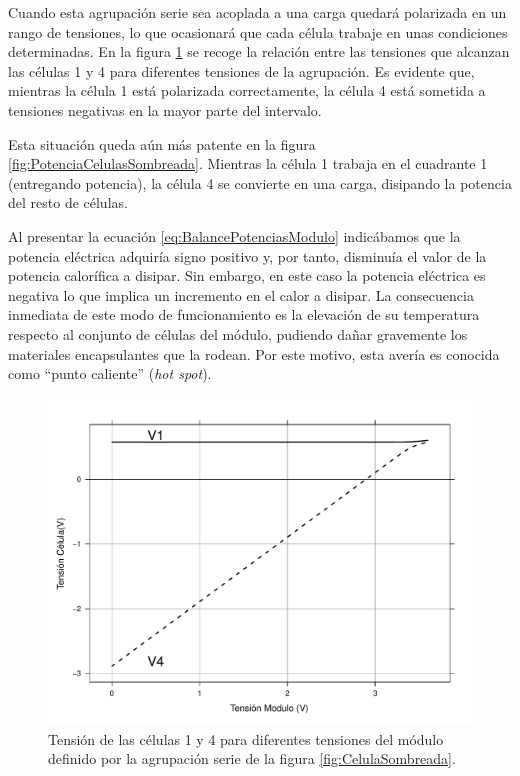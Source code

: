 Cuando esta agrupación serie sea acoplada a una carga quedará polarizada
en un rango de tensiones, lo que ocasionará que cada célula trabaje
en unas condiciones determinadas. En la figura \ref{fig:TensionesCelulaSombreada}
se recoge la relación entre las tensiones que alcanzan las células
1 y 4 para diferentes tensiones de la agrupación. Es evidente que,
mientras la célula 1 está polarizada correctamente, la célula 4 está
sometida a tensiones negativas en la mayor parte del intervalo. 

Esta situación queda aún más patente en la figura \ref{fig:PotenciaCelulasSombreada}.
Mientras la célula 1 trabaja en el cuadrante 1 (entregando potencia),
la célula 4 se convierte en una carga, disipando la potencia del resto
de células. 

Al presentar la ecuación \ref{eq:BalancePotenciasModulo} indicábamos
que la potencia eléctrica adquiría signo positivo y, por tanto, disminuía
el valor de la potencia calorífica a disipar. Sin embargo, en este
caso la potencia eléctrica es negativa lo que implica un incremento
en el calor a disipar. La consecuencia inmediata de este modo de funcionamiento
es la elevación de su temperatura respecto al conjunto de células
del módulo, pudiendo dañar gravemente los materiales encapsulantes
que la rodean. Por este motivo, esta avería es conocida como {}``punto
caliente'' (\emph{hot spot}).


\begin{figure}
\begin{centering}
\includegraphics[scale=0.5]{../figs/TensionCelula_Sombras}
\end{centering}

\caption{Tensión de las células 1 y 4 para diferentes tensiones del módulo
definido por la agrupación serie de la figura \ref{fig:CelulaSombreada}.\label{fig:TensionesCelulaSombreada}}

\end{figure}



